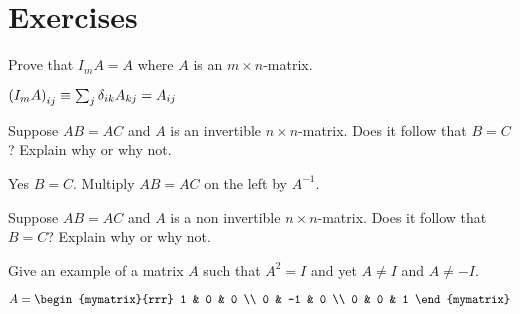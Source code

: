 \section*{Exercises}

\begin{enumialphparenastyle}

\begin{ex} Prove that $I_{m}A=A$ where $A$ is an $m\times n$-matrix.
\begin{sol}
 $\left(
I_{m}A\right) _{ij}\equiv \sum_{j}\delta _{ik}A_{kj}=A_{ij}$
\end{sol}
\end{ex}

\begin{ex} Suppose $AB=AC$ and $A$ is an invertible $n\times n$-matrix. Does it
follow that $B=C$? Explain why or why not. 
\begin{sol}
Yes $B=C$. Multiply $AB = AC$ on the left by $A^{-1}$. 
\end{sol}
\end{ex}

\begin{ex} Suppose $AB=AC$ and $A$ is a non invertible $n\times n$-matrix. Does it follow that $B=C$? Explain why or why not.  
\end{ex}

\begin{ex} Give an example of a matrix $A$ such that $A^{2}=I$ and yet $A\neq I$
and $A\neq -I$. 
\begin{sol}
$A = \begin{mymatrix}{rrr}
1 & 0 & 0 \\
0 & -1 & 0 \\
0 & 0 & 1
\end{mymatrix} $
\end{sol}
\end{ex}

\end{enumialphparenastyle}
